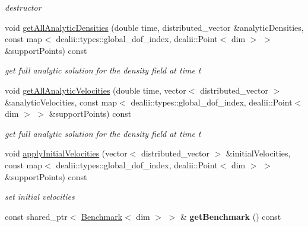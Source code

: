 \begin{DoxyCompactItemize}
\begin{DoxyCompactList}\small\item\em destructor \item\end{DoxyCompactList}\item 
\hypertarget{classnatrium_1_1BenchmarkCFDSolver_a486d464112256436c1c3300b28519cbb}{
void \hyperlink{classnatrium_1_1BenchmarkCFDSolver_a486d464112256436c1c3300b28519cbb}{getAllAnalyticDensities} (double time, distributed\_\-vector \&analyticDensities, const map$<$ dealii::types::global\_\-dof\_\-index, dealii::Point$<$ dim $>$ $>$ \&supportPoints) const }
\label{classnatrium_1_1BenchmarkCFDSolver_a486d464112256436c1c3300b28519cbb}

\begin{DoxyCompactList}\small\item\em get full analytic solution for the density field at time t \item\end{DoxyCompactList}\item 
\hypertarget{classnatrium_1_1BenchmarkCFDSolver_aebef5814f8c44ab8d0029114b5998cff}{
void \hyperlink{classnatrium_1_1BenchmarkCFDSolver_aebef5814f8c44ab8d0029114b5998cff}{getAllAnalyticVelocities} (double time, vector$<$ distributed\_\-vector $>$ \&analyticVelocities, const map$<$ dealii::types::global\_\-dof\_\-index, dealii::Point$<$ dim $>$ $>$ \&supportPoints) const }
\label{classnatrium_1_1BenchmarkCFDSolver_aebef5814f8c44ab8d0029114b5998cff}

\begin{DoxyCompactList}\small\item\em get full analytic solution for the density field at time t \item\end{DoxyCompactList}\item 
void \hyperlink{classnatrium_1_1BenchmarkCFDSolver_a7883dcfd4469ae65ae62cad09ae5d160}{applyInitialVelocities} (vector$<$ distributed\_\-vector $>$ \&initialVelocities, const map$<$ dealii::types::global\_\-dof\_\-index, dealii::Point$<$ dim $>$ $>$ \&supportPoints) const 
\begin{DoxyCompactList}\small\item\em set initial velocities \item\end{DoxyCompactList}\item 
\hypertarget{classnatrium_1_1BenchmarkCFDSolver_aa5a174cf76431ba7b1721f1ce55df967}{
const shared\_\-ptr$<$ \hyperlink{classnatrium_1_1Benchmark}{Benchmark}$<$ dim $>$ $>$ \& {\bfseries getBenchmark} () const }
\label{classnatrium_1_1BenchmarkCFDSolver_aa5a174cf76431ba7b1721f1ce55df967}


\end{DoxyCompactItemize}
